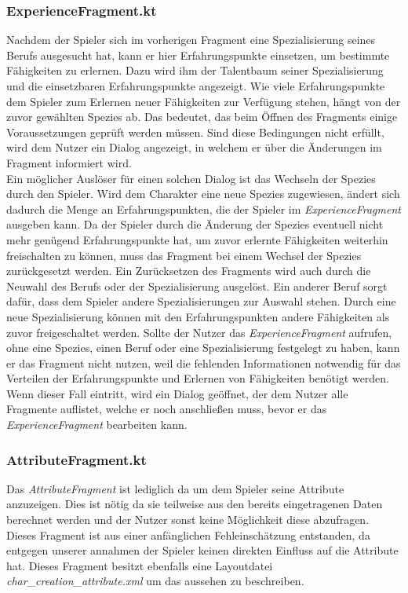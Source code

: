 \subsubsection{ExperienceFragment.kt}
Nachdem der Spieler sich im vorherigen Fragment eine Spezialisierung seines Berufs ausgesucht hat, kann er hier Erfahrungspunkte einsetzen, um bestimmte Fähigkeiten zu erlernen. Dazu wird ihm der Talentbaum seiner Spezialisierung und die einsetzbaren Erfahrungspunkte angezeigt. Wie viele Erfahrungspunkte dem Spieler zum Erlernen neuer Fähigkeiten zur Verfügung stehen, hängt von der zuvor gewählten Spezies ab. Das bedeutet, das beim Öffnen des Fragments einige Voraussetzungen geprüft werden müssen. Sind diese Bedingungen nicht erfüllt, wird dem Nutzer ein Dialog angezeigt, in welchem er über die Änderungen im Fragment informiert wird.\\

Ein möglicher Auslöser für einen solchen Dialog ist das Wechseln der Spezies durch den Spieler. Wird dem Charakter eine neue Spezies zugewiesen, ändert sich dadurch die Menge an Erfahrungspunkten, die der Spieler im \textit{ExperienceFragment} ausgeben kann. Da der Spieler durch die Änderung der Spezies eventuell nicht mehr genügend Erfahrungspunkte hat, um zuvor erlernte Fähigkeiten weiterhin freischalten zu können, muss das Fragment bei einem Wechsel der Spezies zurückgesetzt werden. Ein Zurücksetzen des Fragments wird auch durch die Neuwahl des Berufs oder der Spezialisierung ausgelöst. Ein anderer Beruf sorgt dafür, dass dem Spieler andere Spezialisierungen zur Auswahl stehen. Durch eine neue Spezialisierung können mit den Erfahrungspunkten andere Fähigkeiten als zuvor freigeschaltet werden. Sollte der Nutzer das \textit{ExperienceFragment} aufrufen, ohne eine Spezies, einen Beruf oder eine Spezialisierung festgelegt zu haben, kann er das Fragment nicht nutzen, weil die fehlenden Informationen notwendig für das Verteilen der Erfahrungspunkte und Erlernen von Fähigkeiten benötigt werden. Wenn dieser Fall eintritt, wird ein Dialog geöffnet, der dem Nutzer alle Fragmente auflistet, welche er noch anschließen muss, bevor er das \textit{ExperienceFragment} bearbeiten kann.

\subsubsection{AttributeFragment.kt}

Das \textit{AttributeFragment} ist lediglich da um dem Spieler seine Attribute anzuzeigen. Dies ist nötig da sie teilweise aus den bereits eingetragenen Daten berechnet werden und der Nutzer sonst keine Möglichkeit diese abzufragen. Dieses Fragment ist aus einer anfänglichen Fehleinschätzung entstanden, da entgegen unserer annahmen der Spieler keinen direkten Einfluss auf die Attribute hat. Dieses Fragment besitzt ebenfalls eine Layoutdatei \textit{char\_creation\_attribute.xml} um das aussehen zu beschreiben.

